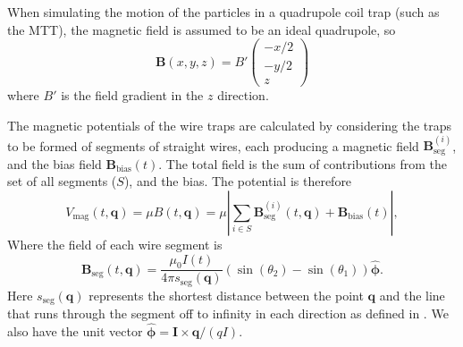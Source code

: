 When simulating the motion of the particles in a quadrupole coil trap (such as
the MTT), the magnetic field is assumed to be an ideal quadrupole, so
%
\begin{equation}
  \mathbf{B}(x, y, z) = B'\begin{pmatrix} -x/2 \\ -y/2 \\ z \end{pmatrix}
\end{equation}
where $B'$ is the field gradient in the $z$ direction. 

The magnetic potentials of the wire traps are calculated by considering the
traps to be formed of segments of straight wires, each producing a magnetic
field $\mathbf{B}_\text{seg}^{(i)}$, and the bias field
$\mathbf{B}_\text{bias}(t)$.  The total field is the sum of contributions from
the set of all segments ($S$), and the bias. The potential is therefore
%
\begin{equation} V_\text{mag}(t, \mathbf{q}) = \mu B (t, \mathbf{q}) = \mu
\left| \sum_{i\in S} \mathbf{B}_\text{seg}^{(i)}(t, \mathbf{q}) +
\mathbf{B}_\text{bias}(t)\right|,  \end{equation}
%
Where the field of each wire segment is~\cite{Griffiths2017}
%
\begin{equation} \mathbf{B}_\text{seg}(t, \mathbf{q}) = \frac{\mu_0 I(t)}{4\pi
s_\text{seg}(\mathbf{q})} (\sin(\theta_2)  -
\sin(\theta_1))\hat{\mathbf{\phi}}. \label{sim:eq:segmentfield}
\end{equation}
%
Here $s_\text{seg}(\mathbf{q})$ represents the shortest distance between the
point $\mathbf{q}$ and the line that runs through the segment off to infinity
in each direction as defined in . We also have
the unit vector $\hat{\mathbf{\phi}} = \mathbf{I}\times\mathbf{q}/(qI)$.

